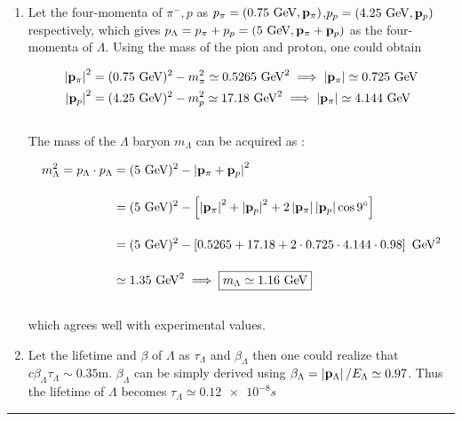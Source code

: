 \begin{solution}
\begin{enumerate}[label=(\alph*)]
    \item Let the four-momenta of $\pi^-,p$ as $p_\pi = (\num{0.75}\text{ GeV},\mathbf{p}_\pi)$,$p_p = (\num{4.25}\text{ GeV},\mathbf{p}_p)$ respectively, which gives $p_\Lambda = p_\pi + p_p = (5 \text{ GeV},\mathbf{p}_\pi + \mathbf{p}_p)$ as the four-momenta of $\Lambda$. 
    Using the mass of the pion and proton, one could obtain 

    \begin{align*}
        \left| \mathbf{p}_\pi \right|^2  &= (0.75 \text{ GeV})^2 - m_\pi^2 \simeq 0.5265 \text{ GeV}^2 \implies  \left| \mathbf{p}_\pi \right| \simeq  0.725 \text{ GeV} \\
        \left| \mathbf{p}_p \right|^2    &= (4.25 \text{ GeV})^2 - m_p^2 \simeq 17.18 \text{ GeV}^2 \implies  \left| \mathbf{p}_\pi \right| \simeq 4.144 \text{ GeV}
    \end{align*}\\
    The mass of the $\Lambda$ baryon $m_\Lambda$ can be acquired as : 

    \begin{align*}
        m_\Lambda^2 = p_\Lambda \cdot p_\Lambda &= (5 \text{ GeV})^2 - \left| \mathbf{p}_\pi + \mathbf{p}_p \right|^2 \\[0.15in]
                                              &= (5 \text{ GeV})^2 - \left[ \left| \mathbf{p}_\pi \right|^2 +  \left| \mathbf{p}_p \right|^2 + 2  \left| \mathbf{p}_\pi \right| \left| \mathbf{p}_p \right| \cos 9^\circ  \right] \\[0.15in]
                                              &= (5 \text{ GeV})^2 - \left[  0.5265+  17.18  + 2 \cdot 0.725 \cdot 4.144 \cdot  0.98  \right] \text{ GeV}^2 \\[0.15in] 
                                              &\simeq 1.35 \text{ GeV}^2 \implies \boxed{m_\Lambda \simeq 1.16 \text{ GeV}}
    \end{align*}\\
    which agrees well with experimental values.
    \item Let the lifetime and $\beta$ of $\Lambda$ as $\tau_\Lambda$ and $\beta_\Lambda$ then one could realize that $c\beta_\Lambda \tau_\Lambda \sim 0.35 \unit{\metre}$.
    $\beta_\Lambda$ can be simply derived using $\beta_\Lambda = \left| \mathbf{p}_\Lambda \right|/E_\Lambda \simeq 0.97$. Thus the lifetime of $\Lambda$ becomes $\boxed{\tau_\Lambda \simeq \num{0.12e-8} \unit{s}}$
\end{enumerate}
\end{solution} 
\noindent\rule{7in}{1.5pt}



